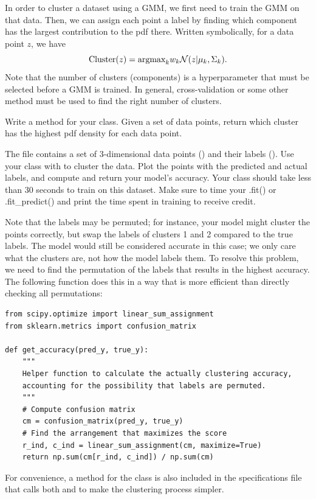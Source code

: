 In order to cluster a dataset using a GMM, we first need to train the GMM on that data.
Then, we can assign each point a label by finding which component has the largest contribution to the pdf there.
Written symbolically, for a data point \(z\), we have
\[
\mathrm{Cluster}(z)=\mbox{argmax}_k w_k \mathcal{N}(z|\mu_k, \Sigma_k).
\]
Note that the number of clusters (components) is a hyperparameter that must be selected before a GMM is trained.
In general, cross-validation or some other method must be used to find the right number of clusters.


\begin{problem}
Write a  method for your class.
Given a set of data points, return which cluster has the highest pdf density for each data point.

The file  contains a set of 3-dimensional data points () and their labels ().
Use your class with  to cluster the data.
Plot the points with the predicted and actual labels, and compute and return your model's accuracy.
Your class should take less than 30 seconds to train on this dataset. Make sure to time your .fit() or .fit\_predict() 
and print the time spent in training to receive credit.

Note that the labels may be permuted; for instance, your model might cluster the points correctly, but swap the labels of clusters 1 and 2 compared to the true labels.
The model would still be considered accurate in this case; we only care what the clusters are, not how the model labels them.
To resolve this problem, we need to find the permutation of the labels that results in the highest accuracy.
The following function does this in a way that is more efficient than directly checking all permutations:
\begin{lstlisting}
from scipy.optimize import linear_sum_assignment
from sklearn.metrics import confusion_matrix

def get_accuracy(pred_y, true_y):
    """
    Helper function to calculate the actually clustering accuracy,
    accounting for the possibility that labels are permuted.
    """
    # Compute confusion matrix
    cm = confusion_matrix(pred_y, true_y)
    # Find the arrangement that maximizes the score
    r_ind, c_ind = linear_sum_assignment(cm, maximize=True)
    return np.sum(cm[r_ind, c_ind]) / np.sum(cm)
\end{lstlisting}

For convenience, a method  for the class is also included in the specifications file that calls both  and  to make the clustering process simpler.
\end{problem}

